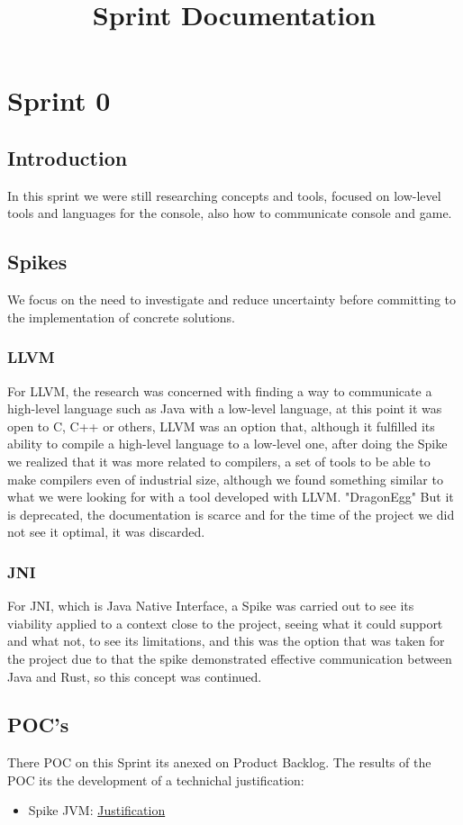 \documentclass[a4paper,12pt]{article}
\title{Sprint Documentation}
\author{}
\date{}
\begin{document}
\maketitle

\tableofcontents
\newpage

\section{Sprint 0}
\subsection{Introduction}
In this sprint we were still researching concepts and tools, focused on low-level tools and languages for the console, also how to communicate console and game.
\subsection{Spikes}
We focus on the need to investigate and reduce uncertainty before committing to the implementation of concrete solutions.
\subsubsection{LLVM}
For LLVM, the research was concerned with finding a way to communicate a high-level language such as Java with a low-level language, at this point it was open to C, C++ or others, LLVM was an option that, although it fulfilled its ability to compile a high-level language to a low-level one, after doing the Spike we realized that it was more related to compilers, a set of tools to be able to make compilers even of industrial size, although we found something similar to what we were looking for with a tool developed with LLVM. "DragonEgg" But it is deprecated, the documentation is scarce and for the time of the project we did not see it optimal, it was discarded.
\subsubsection{JNI}
For JNI, which is Java Native Interface, a Spike was carried out to see its viability applied to a context close to the project, seeing what it could support and what not, to see its limitations, and this was the option that was taken for the project due to that the spike demonstrated effective communication between Java and Rust, so this concept was continued.
\subsection{POC's}
There POC on this Sprint its anexed on Product Backlog.
The results of the POC its the development of a technichal justification:
\begin{itemize}    
    \item Spike JVM: \href{https://docs.google.com/document/d/1OWdCxe9lFPcMpADiyAyRCWGAioo0fwIuzMuRER24MHM/edit#heading=h.ql4vc1ru9w5i}{Justification}
\end{itemize}
\end{document}

